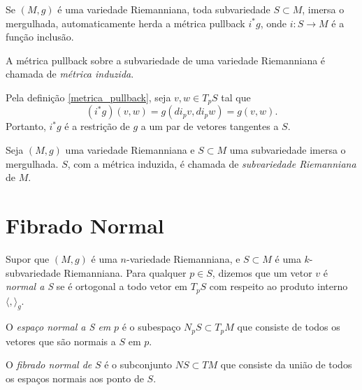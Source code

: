 \begin{observacao}
	Se $(M,g)$ é uma variedade Riemanniana, toda subvariedade $S \subset M$, imersa o mergulhada, automaticamente herda a métrica pullback $i^* g$, onde $i: S \rightarrow M$ é a função inclusão.
\end{observacao}

\begin{definicao}\label{metrica_induzida}
	A métrica pullback sobre a subvariedade de uma variedade Riemanniana é chamada de \emph{métrica induzida}.
\end{definicao}

\begin{observacao}
	Pela definição \ref{metrica_pullback}, seja $v,w \in T_p S$ tal que
	\begin{equation*}
		(i^* g)(v,w) = g(di_p v, di_p w) = g(v,w). 
	\end{equation*}
	Portanto, $i^* g$ é a restrição de $g$ a um par de vetores tangentes a $S$. 
\end{observacao}

\begin{definicao}
	Seja $(M,g)$ uma variedade Riemanniana e $S \subset M$ uma subvariedade imersa o mergulhada. $S$, com a métrica induzida, é chamada de \emph{subvariedade Riemanniana} de $M$.
\end{definicao}

\section{Fibrado Normal}

\begin{definicao}
	Supor que $(M,g)$ é uma $n$-variedade Riemanniana, e $S \subset M$ é uma $k$-subvariedade Riemanniana. Para qualquer $p \in S$, dizemos que um vetor $v$ é \emph{normal a S}  se é ortogonal a todo vetor em $T_p S$ com respeito ao produto interno $\langle , \rangle_g$.
\end{definicao}

\begin{definicao}
	O \emph{espaço normal a S em} $p$ é o subespaço $N_p S \subset T_p M$ que consiste de todos os vetores que são normais a $S$ em $p$.
\end{definicao}

\begin{definicao}
	O \emph{fibrado normal de} $S$ é o subconjunto $NS \subset TM$ que consiste da união de todos os espaços normais aos ponto de $S$.
\end{definicao}


